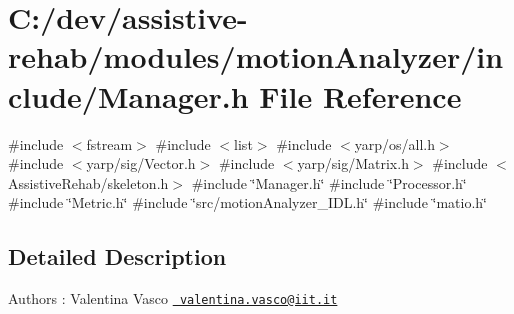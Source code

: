 \section{C\+:/dev/assistive-\/rehab/modules/motion\+Analyzer/include/\+Manager.h File Reference}
\label{Manager_8h}
{\ttfamily \#include $<$fstream$>$}\newline
{\ttfamily \#include $<$list$>$}\newline
{\ttfamily \#include $<$yarp/os/all.\+h$>$}\newline
{\ttfamily \#include $<$yarp/sig/\+Vector.\+h$>$}\newline
{\ttfamily \#include $<$yarp/sig/\+Matrix.\+h$>$}\newline
{\ttfamily \#include $<$Assistive\+Rehab/skeleton.\+h$>$}\newline
{\ttfamily \#include \char`\"{}Manager.\+h\char`\"{}}\newline
{\ttfamily \#include \char`\"{}Processor.\+h\char`\"{}}\newline
{\ttfamily \#include \char`\"{}Metric.\+h\char`\"{}}\newline
{\ttfamily \#include \char`\"{}src/motion\+Analyzer\+\_\+\+I\+D\+L.\+h\char`\"{}}\newline
{\ttfamily \#include \char`\"{}matio.\+h\char`\"{}}\newline


\subsection{Detailed Description}
\begin{DoxyAuthor}{Authors}
\+: Valentina Vasco \href{mailto:valentina.vasco@iit.it}{\texttt{ valentina.\+vasco@iit.\+it}} 
\end{DoxyAuthor}
